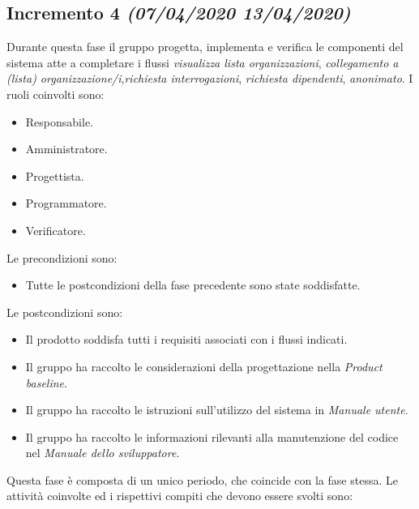 \documentclass[../piano-di-progetto.tex]{subfiles}
\begin{document}
\subsection[Incremento 4]{Incremento 4 {\normalsize\normalfont\itshape(07/04/2020  13/04/2020)}}%
\label{sub:incremento_4}
Durante questa fase il gruppo progetta, implementa e verifica le componenti del sistema atte a completare i flussi \textit{visualizza lista organizzazioni}, \textit{collegamento a (lista) organizzazione/i},\textit{richiesta interrogazioni}, \textit{richiesta dipendenti}, \textit{anonimato}.
I ruoli coinvolti sono:
\begin{itemize}
  \item Responsabile.
  \item Amministratore.
  \item Progettista.
  \item Programmatore.
  \item Verificatore.
\end{itemize}
Le precondizioni sono:
\begin{itemize}
  \item Tutte le postcondizioni della fase precedente sono state soddisfatte.
\end{itemize}
Le postcondizioni sono:
\begin{itemize}
  \item Il prodotto soddisfa tutti i requisiti associati con i flussi indicati.
  \item Il gruppo ha raccolto le considerazioni della progettazione nella \textit{Product baseline}.
  \item Il gruppo ha raccolto le istruzioni sull'utilizzo del sistema in \textit{Manuale utente}.
  \item Il gruppo ha raccolto le informazioni rilevanti alla manutenzione del codice nel \textit{Manuale dello sviluppatore}.
\end{itemize}
Questa fase è composta di un unico periodo, che coincide con la fase stessa.
Le attività coinvolte ed i rispettivi compiti che devono essere svolti sono:
\end{document}
